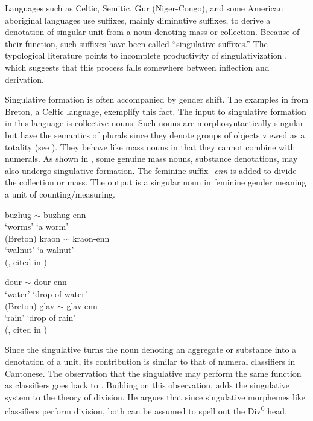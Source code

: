 \documentclass[output=paper,colorlinks,citecolor=brown]{langscibook}
\begin{document}
Languages such as Celtic, Semitic, Gur (Niger-Congo), and some American aboriginal languages use suffixes, mainly diminutive suffixes, to derive a denotation of singular unit from a noun denoting mass or collection. Because of their function, such suffixes have been called ``singulative suffixes.'' The typological literature points to incomplete productivity of singulativization \citep{Stolz2001}, which suggests that this process falls somewhere between inflection and derivation.  

Singulative formation is often accompanied by gender shift. The examples in  from Breton, a Celtic language, exemplify this fact. The input to singulative formation in this language is collective nouns. Such nouns are morphosyntactically singular but have the semantics of plurals since they denote groups of objects viewed as a totality (see \citealt{Acquaviva2015}). They behave like mass nouns in that they cannot combine with numerals. As shown in , some genuine mass nouns, substance denotations, may also undergo singulative formation. The feminine suffix \textit{-enn} is added to divide the collection or mass. The output is a singular noun in feminine gender meaning a unit of counting/measuring.

\ea\label{ex:geist:21}
\ea\gll buzhug $\sim$ buzhug-enn \\
`worms' {} {`a worm'} \\ \hfill (Breton) 
\label{ex:geist:21a}
\ex\gll kraon $\sim$ kraon-enn \\
`walnut' {} {`a walnut'} \\ 
\glt \hfill (\citealt{Stump2005}, cited in \citealt{Mathieu2012}) 
\label{ex:geist:21b}
\z\z

\ea\label{ex:geist:22}
\ea\gll dour $\sim$ dour-enn \\
`water' {} {`drop of water'} \\ \hfill (Breton)
\label{ex:geist:22a}
\ex\gll glav $\sim$ glav-enn \\
`rain' {} {`drop of rain'} \\
\glt \hfill (\citealt{Stump2005}, cited in \citealt{Mathieu2012}) 
\label{ex:geist:22b}
\z\z

\noindent Since the singulative turns the noun denoting an aggregate or substance into a denotation of a unit, its contribution is similar to that of numeral classifiers in Cantonese. The observation that the singulative may perform the same function as classifiers goes back to \citet[26]{Greenberg1972}. Building on this observation, \citet{Mathieu2012,Mathieu2014} adds the singulative system to the theory of division. He argues that since singulative morphemes like classifiers perform division, both can be assumed to spell out the Div\textsuperscript{0} head. 
\end{document}
